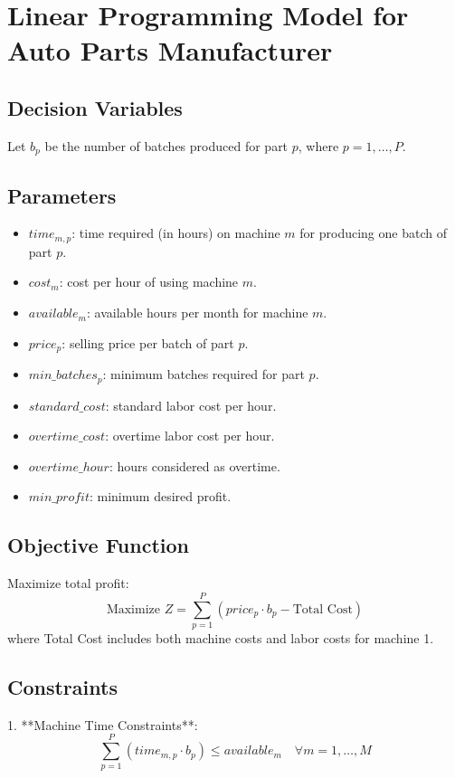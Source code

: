 \documentclass{article}
\begin{document}
\section*{Linear Programming Model for Auto Parts Manufacturer}

\subsection*{Decision Variables}
Let \( b_p \) be the number of batches produced for part \( p \), where \( p = 1, \ldots, P \).

\subsection*{Parameters}
\begin{itemize}
    \item \( time_{m,p} \): time required (in hours) on machine \( m \) for producing one batch of part \( p \).
    \item \( cost_m \): cost per hour of using machine \( m \).
    \item \( available_m \): available hours per month for machine \( m \).
    \item \( price_p \): selling price per batch of part \( p \).
    \item \( min\_batches_p \): minimum batches required for part \( p \).
    \item \( standard\_cost \): standard labor cost per hour.
    \item \( overtime\_cost \): overtime labor cost per hour.
    \item \( overtime\_hour \): hours considered as overtime.
    \item \( min\_profit \): minimum desired profit.
\end{itemize}

\subsection*{Objective Function}
Maximize total profit:
\[
\text{Maximize } Z = \sum_{p=1}^{P} (price_p \cdot b_p - \text{Total Cost})
\]
where Total Cost includes both machine costs and labor costs for machine 1.

\subsection*{Constraints}
1. **Machine Time Constraints**:
\[
\sum_{p=1}^{P} (time_{m,p} \cdot b_p) \leq available_m \quad \forall m = 1, \ldots, M
\]
\end{document}

